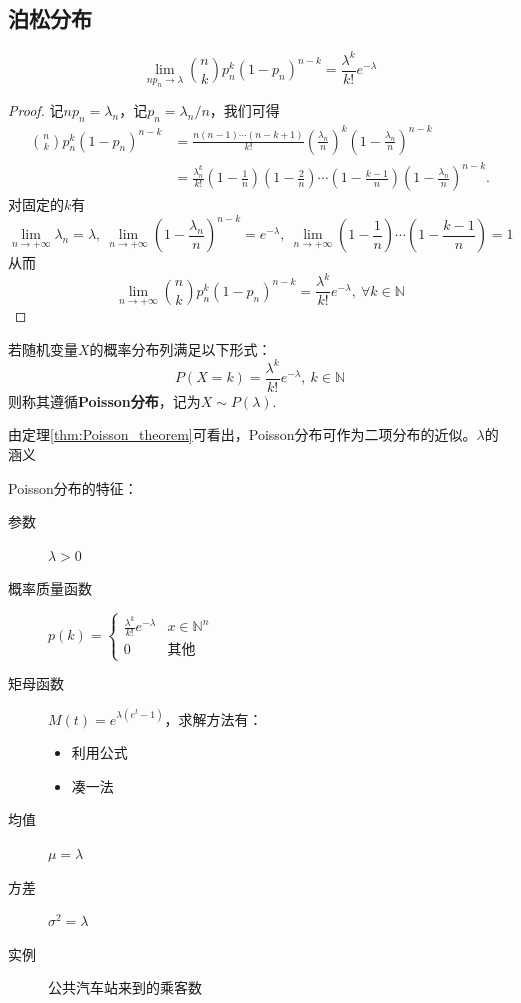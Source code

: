 \subsection{泊松分布}

\begin{theorem}[Poisson逼近]\label{thm:Poisson_theorem}
    \[ \lim_{n p_n \to \lambda} \binom{n}{k} p_n^{k} (1-p_n)^{n-k} = \frac{\lambda^{k}}{k !}e^{-\lambda} \]
\end{theorem}
\begin{proof}
    记$np_n=\lambda_n$，记$p_n=\lambda_n/n$，我们可得
    \begin{align*}
        \binom {n}{k} p_n^k(1-p_n)^{n-k} & = \frac{n(n-1)\cdots(n-k+1)}{k!}\left( \frac{\lambda_n}n \right)^k \left( 1 - \frac{\lambda_n}n \right)^{n-k} \\
                                         & = \frac{\lambda_n^k}{k!}\left( 1 - \frac1n \right)\left( 1 - \frac2n \right) \cdots
        \left( 1 - \frac{k-1}n \right)
        \left( 1 - \frac{\lambda_n}n \right)^{n-k}.
    \end{align*}
    对固定的$k$有
    \[ \lim_{n\to+\infty}\lambda_n = \lambda,\ \lim_{n\to+\infty}\left( 1 - \frac{\lambda_n}n \right)^{n-k} = e^{-\lambda},\ \lim_{n\to+\infty}\left( 1 - \frac{1}{n} \right) \cdots \left( 1 - \frac{k-1}n \right) = 1 \]
    从而
    \[ \lim_{n\to+\infty} \binom{n}{k} p_n^k(1-p_n)^{n-k}  = \frac{\lambda^k}{k!}e^{-\lambda} ,\ \forall k \in \mathbb{N}\]
\end{proof}

\begin{definition}[Poisson分布]
    若随机变量$X$的概率分布列满足以下形式：
    \[ P(X = k) = \frac{\lambda^k}{k!}e^{-\lambda},\ k \in \mathbb{N} \]
    则称其遵循\textbf{Poisson分布}，记为$X \sim P(\lambda)$.
\end{definition}

\begin{remark}
    由定理\ref{thm:Poisson_theorem}可看出，Poisson分布可作为二项分布的近似。$\lambda$的涵义%
\end{remark}

Poisson分布的特征：
\begin{description}
    \item[参数] $\lambda>0$
    \item[概率质量函数] $p(k)=\begin{cases}
                \frac{\lambda^{k}}{k !}e^{-\lambda} & x \in \mathbb{N}^n \\
                0                                   & \text{其他}
            \end{cases}$
    \item[矩母函数] $M(t)=e^{\lambda (e^t -1)}$，求解方法有：
        \begin{itemize}
            \item 利用公式
            \item 凑一法
        \end{itemize}
    \item[均值] $\mu=\lambda$
    \item[方差] $\sigma^2=\lambda$
    \item[实例] 公共汽车站来到的乘客数
\end{description}

